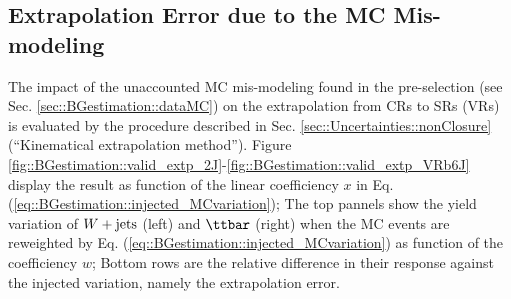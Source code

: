 \subsection{Extrapolation Error due to the MC Mis-modeling} \label{sec::App::valid_extp}
The impact of the unaccounted MC mis-modeling found in the pre-selection (see Sec. \ref{sec::BGestimation::dataMC}) on the extrapolation from CRs to SRs (VRs) is evaluated by the procedure described in Sec. \ref{sec::Uncertainties::nonClosure} (``Kinematical extrapolation method'').
Figure \ref{fig::BGestimation::valid_extp_2J}-\ref{fig::BGestimation::valid_extp_VRb6J} display the result as function of the linear coefficiency $x$ in Eq. (\ref{eq::BGestimation::injected_MCvariation}); The top pannels show the yield variation of $W+\mathrm{jets}$ (left) and $\ttbar$ (right) when the MC events are reweighted by Eq. (\ref{eq::BGestimation::injected_MCvariation}) as function of the coefficiency $w$; Bottom rows are the relative difference in their response against the injected variation, namely the extrapolation error.






